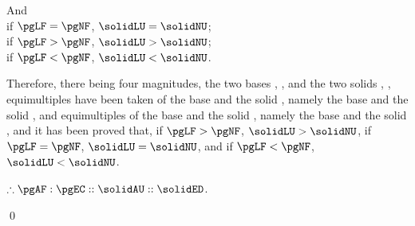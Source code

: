 \documentclass[booklanguage=english]{byrnebook}
\begin{document}
And\\
if $\pgLF = \pgNF$, $\solidLU = \solidNU$;\\
if $\pgLF > \pgNF$, $\solidLU > \solidNU$;\\
if $\pgLF < \pgNF$, $\solidLU < \solidNU$.

Therefore, there being four magnitudes, the two bases \pgAF, \pgEC, and the two solids \solidAU, \solidED, equimultiples have been taken of the base \pgAF and the solid \solidAU, namely the base \pgLF and the solid \solidLU, and equimultiples of the base \pgEC and the solid \solidED, namely the base \pgNF and the solid \solidNU, and it has been proved that, if $\pgLF > \pgNF$, $\solidLU > \solidNU$, if $\pgLF = \pgNF$, $\solidLU = \solidNU$, and if $\pgLF < \pgNF$, $\solidLU < \solidNU$.

$\therefore \pgAF : \pgEC :: \solidAU :: \solidED$. 

\qed
\end{document}
